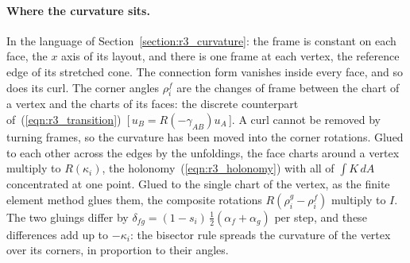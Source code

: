 \paragraph{Where the curvature sits.} In the language of Section~\ref{section:r3_curvature}: the frame is constant on each face, the $x$ axis of its layout, and there is one frame at each vertex, the reference edge of its stretched cone. The connection form vanishes inside every face, and so does its curl. The corner angles $\rho_i^f$ are the changes of frame between the chart of a vertex and the charts of its faces: the discrete counterpart of~(\ref{eqn:r3_transition})~[\,$u_B = R(-\gamma_{AB})u_A$\,]. A curl cannot be removed by turning frames, so the curvature has been moved into the corner rotations. Glued to each other across the edges by the unfoldings, the face charts around a vertex multiply to $R(\kappa_i)$, the holonomy~(\ref{eqn:r3_holonomy}) with all of $\int K\,dA$ concentrated at one point. Glued to the single chart of the vertex, as the finite element method glues them, the composite rotations $R(\rho_i^g - \rho_i^f)$ multiply to $I$. The two gluings differ by $\delta_{fg} = (1 - s_i)\,\frac12(\alpha_f + \alpha_g)$ per step, and these differences add up to $-\kappa_i$: the bisector rule spreads the curvature of the vertex over its corners, in proportion to their angles.

